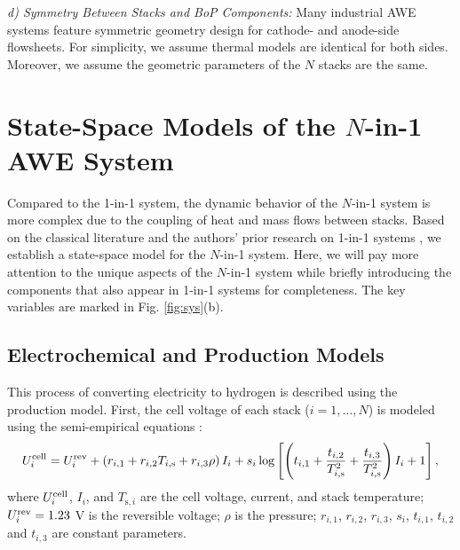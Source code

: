 \documentclass[review,3p,10pt]{elsarticle}
\begin{document}
\emph{d) Symmetry Between Stacks and BoP Components:} Many industrial AWE systems feature symmetric geometry design %
for cathode- and anode-side flowsheets. %
For simplicity, we assume thermal models are identical for both sides. %
Moreover, we assume the geometric parameters of the $N$ stacks are the same.


\section{State-Space Models of the $N$-in-1 AWE System}
\label{sec:model}

Compared to the 1-in-1 system, the dynamic behavior of the $N$-in-1 system is more complex due to the coupling of heat and mass flows between stacks. Based on the classical literature \cite{ulleberg2003modeling} and the authors' prior research on 1-in-1 systems %
\cite{qi2023thermal,qi2023design,qi2021pressure}, we establish a state-space model for the $N$-in-1 system.
Here, we will pay more attention to the unique aspects of the $N$-in-1 system while briefly introducing the components that also appear in 1-in-1 systems for completeness. The key variables are marked in Fig. \ref{fig:sys}(b). %

\subsection{Electrochemical and Production Models}
\label{sec:production}

This process of converting electricity to hydrogen is described using the %
production model. First, the cell voltage of each stack ($i=1,\ldots,N$) is modeled using the semi-empirical equations \cite{sanchez2018semi}:
\begin{align}
  U_i^{\rm{cell}} = U_i^{\rm{rev}} + \left(r_{i,1} +r_{i,2} T_{i,\text{s}} +r_{i,3} \rho \right) I_i
  + s_i \,{\rm{log}} \left[ \left( t_{i,1} +\frac{t_{i,2}}{T_{i,\text{s}}^2} +\frac{t_{i,3}} {T_{i,\text{s}}^2} \right) I_i +1\right], \label{eq:UItotal}
\end{align}
where $U_i^{{\rm{cell}}}$, $I_i$, and $T_{\text{s},i}$ are the cell voltage, current, and stack temperature; $U_i^{\rm{rev}}=1.23$ V is the reversible voltage; 
$\rho$ is the pressure; $r_{i,1}$, $r_{i,2}$, $r_{i,3}$, $s_{i}$, $t_{i,1}$, $t_{i,2}$ and $t_{i,3}$ are constant parameters.
\end{document}
